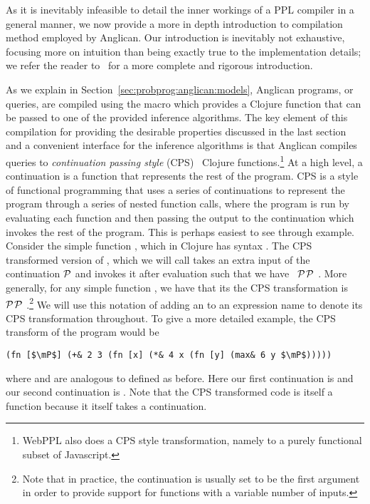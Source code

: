 As it is inevitably infeasible to detail the inner workings of a PPL compiler in a general
manner, we now provide a more in depth introduction to compilation method
employed by Anglican.  Our introduction is inevitably not exhaustive, focusing more on
intuition than being exactly true to the implementation details; we refer the reader
to~\citep{tolpin2016design} for a more complete and rigorous introduction.

As we explain in Section~\ref{sec:probprog:anglican:models},
Anglican programs, or queries, are compiled using the macro \query which provides a
Clojure function that can be passed to one of the provided inference algorithms.
The key element of this compilation for providing the desirable properties discussed
in the last section and a convenient interface for the inference algorithms is that
Anglican compiles queries to \emph{continuation passing style} (CPS)~\citep{appel1989continuation}
Clojure functions.\footnote{WebPPL also does a CPS style transformation, 
	namely to a purely functional subset of Javascript.}
At a high level, a continuation is a function that represents the rest of the
program.  CPS is a style of functional programming that uses a series of continuations
to represent the program through a series of nested function calls, where the program
is run by evaluating each function and then passing the output to the continuation
which invokes the rest of the program.  This is perhaps easiest to see through
example.  Consider the simple function \clj{+}, which in Clojure has syntax .  The
CPS transformed version of \clj{+}, which we will call \clj{+&} takes an extra input
of the continuation $\mathcal{P}$ and invokes it after evaluation such that we have
\clj{(defn +& [a b } ~$\mathcal{P}$\clj{] (}$\mathcal{P}$ .  More generally, for any simple function , we have
that its the CPS transformation is \clj{(defn f& [args} ~$\mathcal{P}$\clj{] (}$\mathcal{P}$ .\footnote{Note that
	in practice, the continuation is usually set to be the first argument in order to provide support
	for functions with a variable number of inputs.}
  We 
will use this notation of adding an \clj{&} to an expression name to denote its CPS transformation throughout.
To give a more detailed example, the CPS transform of the program  would be
\begin{lstlisting}[basicstyle=\ttfamily\small,frame=none]
  (fn [$\mP$] (+& 2 3 (fn [x] (*& 4 x (fn [y] (max& 6 y $\mP$)))))
\end{lstlisting}\vspace{-8pt}
where \clj{*&} and
 are analogous to \clj{+&} defined as before.
Here our first continuation is  and our second continuation 
is .  Note that the CPS transformed code is itself a function because
it itself takes a continuation.  

